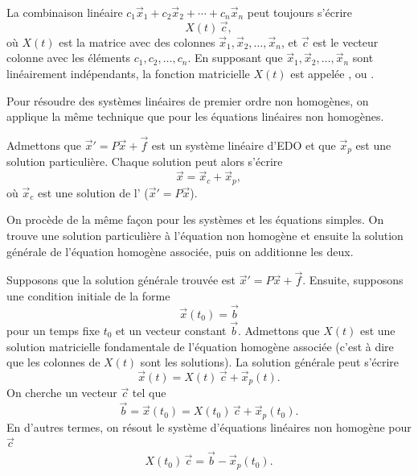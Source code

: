 La combinaison linéaire $c_1 \vec{x}_1 + c_2 \vec{x}_2 + \cdots + c_n
\vec{x}_n$ peut toujours s’écrire
\begin{equation*}
X(t)\,\vec{c} ,
\end{equation*}
où $X(t)$ est la matrice avec des colonnes $\vec{x}_1, \vec{x}_2, \ldots, \vec{x}_n$,
et $\vec{c}$ est le vecteur colonne avec les éléments $c_1, c_2, \ldots, c_n$.
En supposant que $\vec{x}_1,\vec{x}_2,\ldots,\vec{x}_n$ sont linéairement indépendants, la fonction matricielle $X(t)$ est appelée \emph{},
ou \emph{}.

\medskip

Pour résoudre des systèmes linéaires de premier ordre non homogènes, on applique la même technique que pour les équations linéaires non homogènes.

\begin{theorem}
Admettons que
${\vec{x}}' = P\vec{x} + \vec{f}$ est un système linéaire d’EDO et que $\vec{x}_p$ est une solution particulière. Chaque solution peut alors s’écrire
\begin{equation*}
\vec{x} = \vec{x}_c + \vec{x}_p ,
\end{equation*}
où $\vec{x}_c$ est une solution de l' 
(${\vec{x}}' = P\vec{x}$).
\end{theorem}

On procède de la même façon pour les systèmes et les équations simples. On trouve une solution particulière à l’équation non homogène et ensuite la solution générale de l’équation homogène associée, puis on additionne les deux.

\medskip

Supposons que la solution générale trouvée est
${\vec{x}}' = P\vec{x} + \vec{f}$. Ensuite, supposons une condition initiale de la forme
\begin{equation*}
\vec{x}(t_0) = \vec{b}
\end{equation*}
pour un temps fixe $t_0$ et un vecteur constant $\vec{b}$. Admettons que $X(t)$ est une solution matricielle fondamentale de l’équation homogène associée (c’est à dire que les colonnes de $X(t)$ sont les solutions). La solution générale peut s’écrire
\begin{equation*}
\vec{x}(t) = X(t)\,\vec{c} + \vec{x}_p(t).
\end{equation*}
On cherche un vecteur 
$\vec{c}$ tel que
\begin{equation*}
\vec{b} = \vec{x}(t_0) = X(t_0)\,\vec{c} + \vec{x}_p(t_0).
\end{equation*}
En d’autres termes, on résout le système d’équations linéaires non homogène pour $\vec{c}$ 
\begin{equation*}
X(t_0)\,\vec{c} = \vec{b} - \vec{x}_p(t_0) .
\end{equation*}

